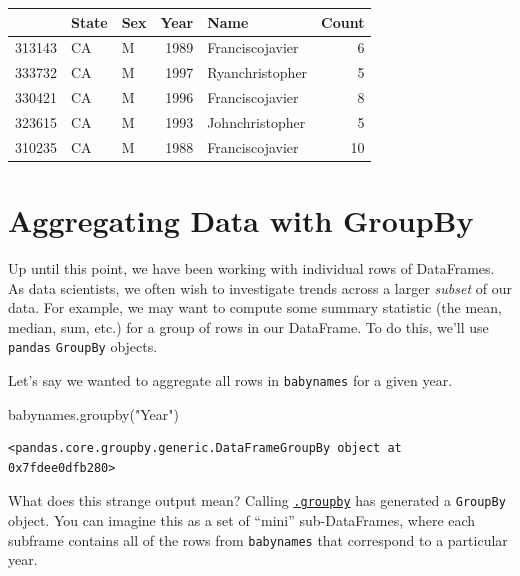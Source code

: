 \documentclass[
  letterpaper,
  DIV=11,
  numbers=noendperiod]{scrreprt}
\newenvironment{Shaded}{\begin{snugshade}}{\end{snugshade}}
\newcommand{\NormalTok}[1]{\textcolor[rgb]{0.00,0.23,0.31}{#1}}
\newcommand{\StringTok}[1]{\textcolor[rgb]{0.13,0.47,0.30}{#1}}
\begin{document}
\begin{tabular}{lllrlr}
\toprule
{} & State & Sex &  Year &             Name &  Count \\
\midrule
313143 &    CA &   M &  1989 &  Franciscojavier &      6 \\
333732 &    CA &   M &  1997 &  Ryanchristopher &      5 \\
330421 &    CA &   M &  1996 &  Franciscojavier &      8 \\
323615 &    CA &   M &  1993 &  Johnchristopher &      5 \\
310235 &    CA &   M &  1988 &  Franciscojavier &     10 \\
\bottomrule
\end{tabular}

\hypertarget{aggregating-data-with-groupby}{%
\section{Aggregating Data with
GroupBy}\label{aggregating-data-with-groupby}}

Up until this point, we have been working with individual rows of
DataFrames. As data scientists, we often wish to investigate trends
across a larger \emph{subset} of our data. For example, we may want to
compute some summary statistic (the mean, median, sum, etc.) for a group
of rows in our DataFrame. To do this, we'll use \texttt{pandas}
\texttt{GroupBy} objects.

Let's say we wanted to aggregate all rows in \texttt{babynames} for a
given year.

\begin{Shaded}
\begin{Highlighting}[]
\NormalTok{babynames.groupby(}\StringTok{"Year"}\NormalTok{)}
\end{Highlighting}
\end{Shaded}

\begin{verbatim}
<pandas.core.groupby.generic.DataFrameGroupBy object at 0x7fdee0dfb280>
\end{verbatim}

What does this strange output mean? Calling
\href{https://pandas.pydata.org/pandas-docs/stable/reference/api/pandas.DataFrame.groupby.html}{\texttt{.groupby}}
has generated a \texttt{GroupBy} object. You can imagine this as a set
of ``mini'' sub-DataFrames, where each subframe contains all of the rows
from \texttt{babynames} that correspond to a particular year.
\end{document}
